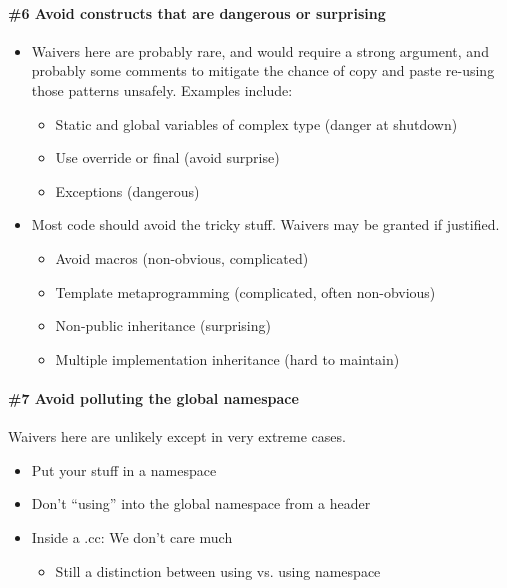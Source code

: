 \paragraph*{\#6 Avoid constructs that are dangerous or surprising}
\begin{itemize}
    \item Waivers here are probably rare, and would require a strong argument, and probably some comments to mitigate the chance of copy and paste re-using those patterns unsafely. Examples include:
    \begin{itemize}
        \item Static and global variables of complex type (danger at shutdown)
        \item Use override or final (avoid surprise)
        \item Exceptions (dangerous)
    \end{itemize}
    \item Most code should avoid the tricky stuff. Waivers may be granted if justified.
    \begin{itemize}
        \item Avoid macros (non-obvious, complicated)
        \item Template metaprogramming (complicated, often non-obvious)
        \item Non-public inheritance (surprising)
        \item Multiple implementation inheritance (hard to maintain)
    \end{itemize}
\end{itemize}

\paragraph*{\#7 Avoid polluting the global namespace}\mbox{}\newline
Waivers here are unlikely except in very extreme cases.
\begin{itemize}
    \item Put your stuff in a namespace
    \item Don’t \enquote{using} into the global namespace from a header
    \item Inside a .cc: We don’t care much
    \begin{itemize}
        \item Still a distinction between using vs. using namespace
    \end{itemize}
\end{itemize}

